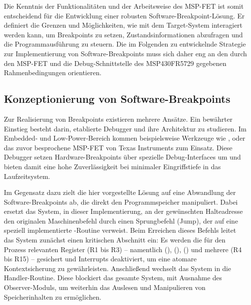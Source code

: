 Die Kenntnis der Funktionalit\"aten und der Arbeitsweise des MSP-FET ist somit entscheidend f\"ur die Entwicklung einer robusten Software-Breakpoint-L\"osung. Er definiert die Grenzen und M\"oglichkeiten, wie mit dem Target-System interagiert werden kann, um Breakpoints zu setzen, Zustandsinformationen abzufragen und die Programmausf\"uhrung zu steuern. Die im Folgenden zu entwickelnde Strategie zur Implementierung von Software-Breakpoints muss sich daher eng an den durch den MSP-FET und die Debug-Schnittstelle des MSP430FR5729 gegebenen Rahmenbedingungen orientieren.


\newpage
\subsection{Konzeptionierung von Software-Breakpoints}
\label{sec:KonzeptionierungSoftwareBreakpoints}
Zur Realisierung von Breakpoints existieren mehrere Ans\"atze. Ein bew\"ahrter Einstieg besteht darin, etablierte Debugger und ihre Architektur zu studieren. Im Embedded‑ und Low‑Power‑Bereich kommen beispielsweise Werkzeuge wie ,  oder das zuvor besprochene MSP-FET von Texas Instruments zum Einsatz. Diese Debugger setzen Hardware-Breakpoints \"uber spezielle Debug‑Interfaces um und bieten damit eine hohe Zuverl\"assigkeit bei minimaler Eingriffstiefe in das Laufzeitsystem.

Im Gegensatz dazu zielt die hier vorgestellte L\"osung auf eine Abwandlung der Software-Breakpoints ab, die direkt den Programmspeicher manipuliert. Dabei ersetzt das System, in dieser Implementierung, an der gew\"unschten Halteadresse den originalen Maschinenbefehl durch einen Sprungbefehl (Jump), der auf eine speziell implementierte -Routine verweist. Beim Erreichen dieses Befehls leitet das System zun\"achst einen kritischen Abschnitt ein: Es werden die f\"ur den Prozess relevanten Register (R1 bis R3) – namentlich  (),  (),  () und \ggf mehrere  (R4 bis R15) – gesichert und Interrupts deaktiviert, um eine atomare Kontextsicherung zu gew\"ahrleisten. Anschlie{\ss}end wechselt das System in die Handler-Routine. Diese blockiert das gesamte System, mit Ausnahme des Observer-Moduls, um weiterhin das Auslesen und Manipulieren von Speicherinhalten zu erm\"oglichen. 


